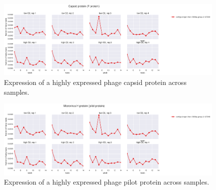 \begin{figure}[H]
\centering
    \includegraphics[width=1.0\textwidth]{./tex/chapter2/figures/170327_loci_read_fracs_Capsid_protein__F_protein_.pdf}
    \begin{singlespace}
    \caption[Expression of a highly expressed phage capsid protein across samples]{
        Expression of a highly expressed phage capsid protein across samples.
        }
    \label{fig:phage_protein_F}
    \end{singlespace}
\end{figure}

\begin{figure}[H]
\centering
    \includegraphics[width=1.0\textwidth]{./tex/chapter2/figures/170327_loci_read_fracs_Microvirus_H_protein__pilot_protein_.pdf}
    \begin{singlespace}
    \caption[Expression of a highly expressed phage pilot protein across samples]{
        Expression of a highly expressed phage pilot protein across samples.
        }
    \label{fig:phage_pilot_protein}
    \end{singlespace}
\end{figure}


